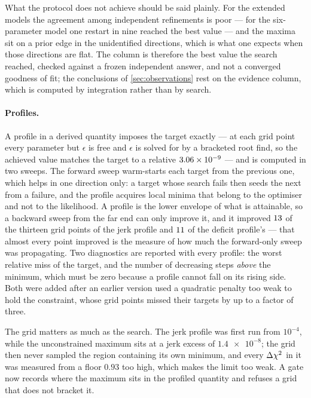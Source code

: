 What the protocol does not achieve should be said plainly. For the extended
models the agreement among independent refinements is poor --- for the
six-parameter model one restart in nine reached the best value --- and the
maxima sit on a prior edge in the unidentified directions, which is what one
expects when those directions are flat. The column is therefore the best value
the search reached, checked against a frozen independent answer, and not a
converged goodness of fit; the conclusions of \cref{sec:observations} rest on
the evidence column, which is computed by integration rather than by search.

\paragraph{Profiles.} A profile in a derived quantity imposes the target
exactly --- at each grid point every parameter but $\epsilon$ is free and
$\epsilon$ is solved for by a bracketed root find, so the achieved value
matches the target to a relative
$\num{3.06e-09}$ --- and is computed in two
sweeps. The forward sweep warm-starts each target from the previous one, which
helps in one direction only: a target whose search fails then seeds the next
from a failure, and the profile acquires local minima that belong to the
optimiser and not to the likelihood. A profile is the lower envelope of what
is attainable, so a backward sweep from the far end can only improve it, and
it improved $13$ of the
thirteen grid points of the jerk profile and
$11$ of the deficit
profile's --- that almost every point improved is the measure of how much the
forward-only sweep was propagating. Two diagnostics are reported with every profile: the worst
relative miss of the target, and the number of decreasing steps \emph{above}
the minimum, which must be zero because a profile cannot fall on its rising
side. Both were added after an earlier version used a quadratic penalty too
weak to hold the constraint, whose grid points missed their targets by up to a
factor of three.

The grid matters as much as the search. The jerk profile was first run from
$10^{-4}$, while the unconstrained maximum sits at a jerk excess of
$\num{1.4e-8}$; the grid then never sampled the region containing its own
minimum, and every $\Delta\chi^{2}$ in it was measured from a floor
$0.93$ too high, which makes the limit too weak. A gate now records where the
maximum sits in the profiled quantity and refuses a grid that does not bracket
it.

